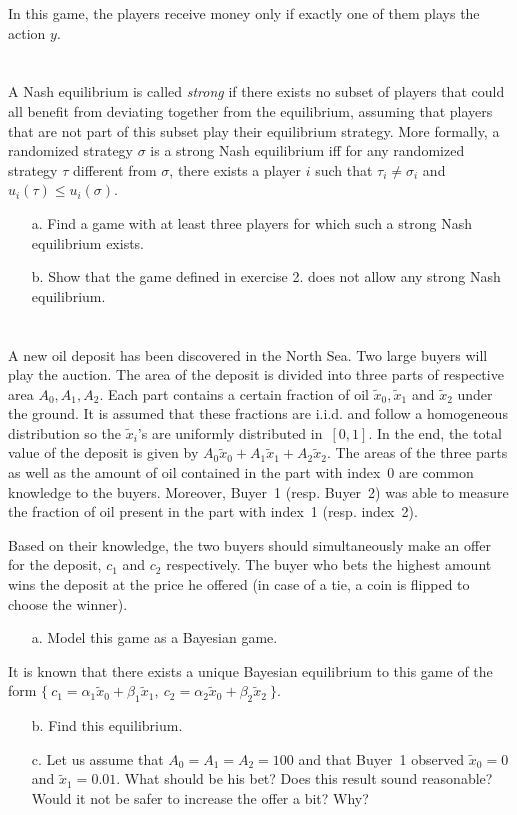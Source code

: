 \documentclass{../ape}
\begin{document}
In this game, the players receive money only if exactly one of them plays the action $y$.

\section{}
A Nash equilibrium is called \emph{strong} if there exists no subset of players that could all benefit from deviating together from the equilibrium, assuming that players that are not part of this subset play their equilibrium strategy. More formally, a randomized strategy $\sigma$ is a strong Nash equilibrium iff for any randomized strategy $\tau$ different from $\sigma$, there exists a player $i$ such that $\tau_i \neq \sigma_i$ and $u_i(\tau) \leq u_i(\sigma)$.
\begin{enumerate}
	\item[a.] Find a game with at least three players for which such a strong Nash equilibrium exists.
	\item[b.] Show that the game defined in exercise 2. does not allow any strong Nash equilibrium.
\end{enumerate}

\section{}
A new oil deposit has been discovered in the North Sea. Two large buyers will play the auction. 
The area of the deposit is divided into three parts of respective area $A_0, A_1, A_2$. Each part contains a certain fraction of oil $\tilde{x}_0, \tilde{x}_1$ and $\tilde{x}_2$ under the ground. It is assumed that these fractions are i.i.d. and follow a homogeneous distribution so the $\tilde{x}_i$'s are uniformly distributed in~$[0, 1]$. In the end, the total value of the deposit is given by $A_0 \tilde{x}_0 + A_1 \tilde{x}_1 + A_2 \tilde{x}_2$. The areas of the three parts as well as the amount of oil contained in the part with index~0 are common knowledge to the buyers. Moreover, Buyer~1 (resp. Buyer~2) was able to measure the fraction of oil present in the part with index~1 (resp. index~2).

Based on their knowledge, the two buyers should simultaneously make an offer for the deposit, $c_1$ and $c_2$ respectively. The buyer who bets the highest amount wins the deposit at the price he offered (in case of a tie, a coin is flipped to choose the winner).
\begin{enumerate}
	\item[a.] Model this game as a Bayesian game.
\end{enumerate}
It is known that there exists a unique Bayesian equilibrium to this game of the form $\{ \ c_1 = \alpha_1 \tilde{x}_0 + \beta_1 \tilde{x}_1, \ c_2 = \alpha_2 \tilde{x}_0 + \beta_2 \tilde{x}_2 \ \}$.
\begin{enumerate}
	\item[b.] Find this equilibrium.
	\item[c.] Let us assume that $A_0 = A_1 = A_2 = 100$ and that Buyer~1 observed $\tilde{x}_0 = 0$ and $\tilde{x}_1 = 0.01$. What should be his bet? Does this result sound reasonable? Would it not be safer to increase the offer a bit? Why?
\end{enumerate}
\end{document}
